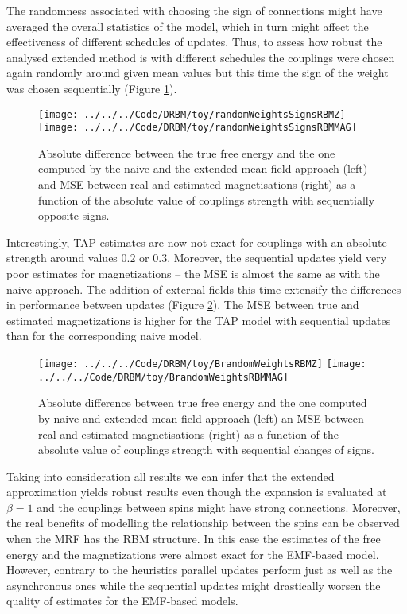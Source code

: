 The randomness associated with choosing the sign of connections might have averaged the overall statistics of the model, which in turn might affect the effectiveness of different schedules of updates. Thus, to assess how robust the analysed extended method is with different schedules the couplings were chosen again randomly around given mean values but this time the sign of the weight was chosen sequentially (Figure \ref{fig:signs}).
\begin{figure}[!htb]
%
 \texttt{[image: ../../../Code/DRBM/toy/randomWeightsSignsRBMZ]}
\endminipage 
{}  
\texttt{[image: ../../../Code/DRBM/toy/randomWeightsSignsRBMMAG]}
\endminipage\hfill
  \caption[Results on RBM toy model with sequential changes of couplings' signs]{Absolute difference between the true free energy and the one computed by the naive and the extended mean field approach (left) and MSE between real and estimated magnetisations (right) as a function of the absolute value of couplings strength with sequentially opposite signs.}
  \label{fig:signs}
\end{figure}

Interestingly, TAP estimates are now not exact for couplings with an absolute strength around values $0.2$ or $0.3$. Moreover, the sequential updates yield very poor estimates for magnetizations -- the MSE is almost the same as with the naive approach. The addition of external fields this time extensify the differences in performance between updates (Figure \ref{fig:bias}). The MSE between true and estimated magnetizations is higher for the TAP model with sequential updates than for the corresponding naive model.

\begin{figure}[!htb]
%
 \texttt{[image: ../../../Code/DRBM/toy/BrandomWeightsRBMZ]}
\endminipage 
{}  
\texttt{[image: ../../../Code/DRBM/toy/BrandomWeightsRBMMAG]}
\endminipage\hfill
  \caption[Results on RBM toy model with external fields]{Absolute difference between true free energy and the one computed by naive and extended mean field approach (left) an MSE between real and estimated magnetisations (right) as a function of the absolute value of couplings strength with sequential changes of signs.}
  \label{fig:bias}
\end{figure}

Taking into consideration all results we can infer that the extended approximation yields robust results even though the expansion is evaluated at $\beta = 1$ and the couplings between spins might have strong connections. Moreover, the real benefits of modelling the relationship between the spins can be observed when the MRF has the RBM structure. In this case the estimates of the free energy and the magnetizations were almost exact for the EMF-based model. However, contrary to the heuristics parallel updates perform just as well as the asynchronous ones while the sequential updates might drastically worsen the quality of estimates for the EMF-based models.